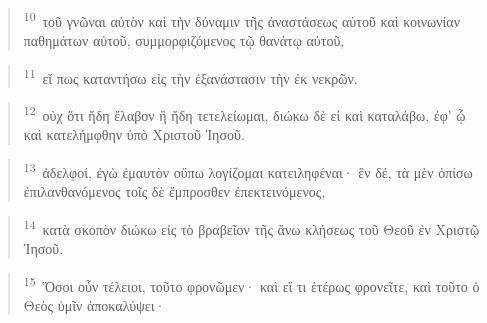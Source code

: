 \documentclass{article}
\newcommand{\currentverse}{1} %
\newcommand{\setcurrentverse}[1]{\renewcommand{\currentverse}{#1}}
\begin{document}
\begin{verse}

\setcurrentverse{10}

\setcounter{footnote}{0}

\textsuperscript{10}~τοῦ γνῶναι αὐτὸν καὶ τὴν δύναμιν τῆς ἀναστάσεως αὐτοῦ καὶ κοινωνίαν παθημάτων αὐτοῦ, συμμορφιζόμενος τῷ θανάτῳ αὐτοῦ,

\end{verse}

\begin{verse}

\setcurrentverse{11}

\setcounter{footnote}{0}

\textsuperscript{11}~εἴ πως καταντήσω εἰς τὴν ἐξανάστασιν τὴν ἐκ νεκρῶν.

\end{verse}

\begin{verse}

\setcurrentverse{12}

\setcounter{footnote}{0}

\textsuperscript{12}~οὐχ ὅτι ἤδη ἔλαβον ἢ ἤδη τετελείωμαι, διώκω δὲ εἰ καὶ καταλάβω, ἐφ’ ᾧ καὶ κατελήμφθην ὑπὸ Χριστοῦ Ἰησοῦ.

\end{verse}

\begin{verse}

\setcurrentverse{13}

\setcounter{footnote}{0}

\textsuperscript{13}~ἀδελφοί, ἐγὼ ἐμαυτὸν οὔπω λογίζομαι κατειληφέναι· ἓν δέ, τὰ μὲν ὀπίσω ἐπιλανθανόμενος τοῖς δὲ ἔμπροσθεν ἐπεκτεινόμενος,

\end{verse}

\begin{verse}

\setcurrentverse{14}

\setcounter{footnote}{0}

\textsuperscript{14}~κατὰ σκοπὸν διώκω εἰς τὸ βραβεῖον τῆς ἄνω κλήσεως τοῦ Θεοῦ ἐν Χριστῷ Ἰησοῦ.

\end{verse}

\begin{verse}

\setcurrentverse{15}

\setcounter{footnote}{0}

\textsuperscript{15}~Ὅσοι οὖν τέλειοι, τοῦτο φρονῶμεν· καὶ εἴ τι ἑτέρως φρονεῖτε, καὶ τοῦτο ὁ Θεὸς ὑμῖν ἀποκαλύψει·

\end{verse}
\end{document}
